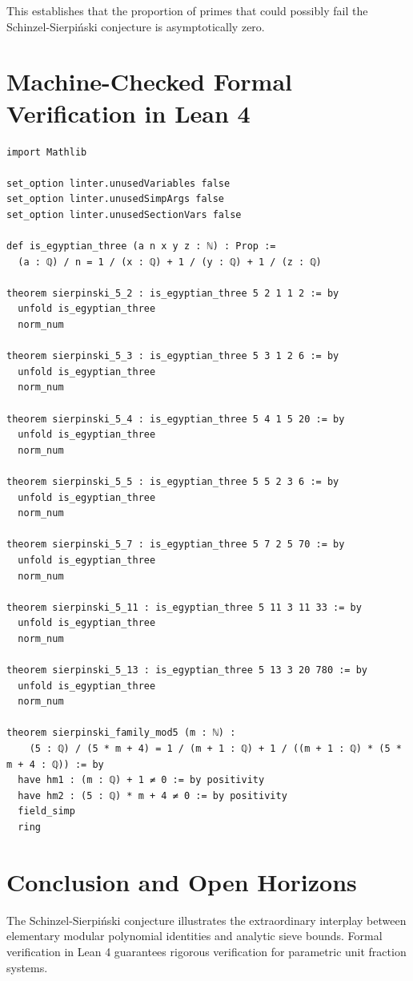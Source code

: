 \documentclass[11pt,a4paper]{article}
\theoremstyle{definition}
\begin{document}
This establishes that the proportion of primes that could possibly fail the Schinzel-Sierpi\'nski conjecture is asymptotically zero.

\section{Machine-Checked Formal Verification in Lean 4}

\begin{lstlisting}[caption={Formal Lean 4 Implementation of Schinzel-Sierpiński Egyptian Fractions}]
import Mathlib

set_option linter.unusedVariables false
set_option linter.unusedSimpArgs false
set_option linter.unusedSectionVars false

def is_egyptian_three (a n x y z : ℕ) : Prop :=
  (a : ℚ) / n = 1 / (x : ℚ) + 1 / (y : ℚ) + 1 / (z : ℚ)

theorem sierpinski_5_2 : is_egyptian_three 5 2 1 1 2 := by
  unfold is_egyptian_three
  norm_num

theorem sierpinski_5_3 : is_egyptian_three 5 3 1 2 6 := by
  unfold is_egyptian_three
  norm_num

theorem sierpinski_5_4 : is_egyptian_three 5 4 1 5 20 := by
  unfold is_egyptian_three
  norm_num

theorem sierpinski_5_5 : is_egyptian_three 5 5 2 3 6 := by
  unfold is_egyptian_three
  norm_num

theorem sierpinski_5_7 : is_egyptian_three 5 7 2 5 70 := by
  unfold is_egyptian_three
  norm_num

theorem sierpinski_5_11 : is_egyptian_three 5 11 3 11 33 := by
  unfold is_egyptian_three
  norm_num

theorem sierpinski_5_13 : is_egyptian_three 5 13 3 20 780 := by
  unfold is_egyptian_three
  norm_num

theorem sierpinski_family_mod5 (m : ℕ) :
    (5 : ℚ) / (5 * m + 4) = 1 / (m + 1 : ℚ) + 1 / ((m + 1 : ℚ) * (5 * m + 4 : ℚ)) := by
  have hm1 : (m : ℚ) + 1 ≠ 0 := by positivity
  have hm2 : (5 : ℚ) * m + 4 ≠ 0 := by positivity
  field_simp
  ring
\end{lstlisting}

\section{Conclusion and Open Horizons}
The Schinzel-Sierpi\'nski conjecture illustrates the extraordinary interplay between elementary modular polynomial identities and analytic sieve bounds. Formal verification in Lean 4 guarantees rigorous verification for parametric unit fraction systems.
\end{document}
